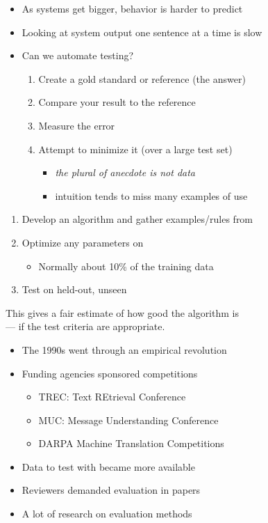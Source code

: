 \documentclass[a4paper,landscape,headrule,footrule,xetex]{foils}
\begin{document}
\MyLogo{}
\begin{itemize}
\item As systems get bigger, behavior is harder to predict
\item Looking at system output one sentence at a time is slow

\item Can we automate testing?
  \begin{enumerate}
  \item Create a gold standard or reference (the  answer)
  \item Compare your result to the reference
  \item Measure the error
  \item Attempt to minimize it  (over a large test set)
    \begin{itemize}
    \item \textit{the plural of anecdote is not data}
    \item intuition tends to miss many examples of use
    \end{itemize}
  \end{enumerate} 

\end{itemize}


\begin{enumerate}
\item Develop an algorithm and gather examples/rules from 
\item Optimize any parameters on 
  \begin{itemize}
  \item Normally about 10\% of the training data
  \end{itemize}
\item Test on held-out, unseen 
\end{enumerate}

This gives a fair estimate of how good the algorithm is 
\\ --- if the test criteria are appropriate.


  \begin{itemize}
  \item The 1990s went through an empirical revolution
  \item Funding agencies sponsored competitions
    \begin{itemize}
    \item TREC: Text REtrieval Conference
    \item MUC: Message Understanding Conference
    \item DARPA Machine Translation Competitions
    \end{itemize}
  \item Data to test with became more available
  \item Reviewers demanded evaluation in papers
  \item A lot of research on evaluation methods
  \end{itemize}
\end{document}
